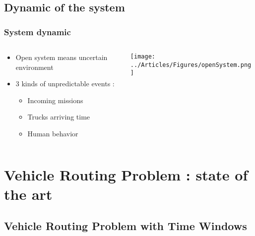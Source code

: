 \documentclass{beamer}
\begin{document}
\subsection*{Dynamic of the system}
\begin{frame}
\frametitle{System dynamic}
	\begin{columns}
		\begin{column}[l]{8cm}
			\begin{itemize}
				\item Open system means uncertain environment
				\item 3 kinds of unpredictable events : 
				\begin{itemize}
 					\item Incoming missions
					\item Trucks arriving time
					\item Human behavior
				\end{itemize}
			\end{itemize}
		\end{column}
		\begin{column}[r]{4cm}
			\begin{center}
				\texttt{[image: ../Articles/Figures/openSystem.png]}
			\end{center}
	 	\end{column}
	\end{columns}
\end{frame}

\section{Vehicle Routing Problem : state of the art}

\subsection*{Vehicle Routing Problem with Time Windows}
\end{document}
